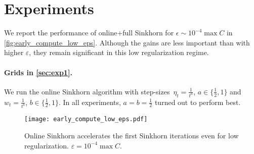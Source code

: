 \section{Experiments}\label{sec:supp_exp}

We report the performance of online+full Sinkhorn for $\epsilon \sim 10^{-4}
\max C$ in \autoref{fig:early_compute_low_eps}. Although the gains are less
important than with higher $\varepsilon$, they remain significant in this low
regularization regime.

\paragraph{Grids in \autoref{sec:exp1}.} We run the online Sinkhorn algorithm
with step-sizes $\eta_t = \frac{1}{t^a}$, $a \in \{ \frac{1}{2}, 1 \}$
and $w_t = \frac{1}{{t^b}}$, $b \in \{ \frac{1}{2}, 1 \}$. In all
experiments, $a = b = \frac{1}{2}$ turned out to perform best.

\begin{figure}[ht]
    \centering
    \texttt{[image: early\_compute\_low\_eps.pdf]}
    \caption{Online Sinkhorn accelerates the first Sinkhorn iterations even for low regularization. $\varepsilon = 10^{-4} \max C$.}
    \label{fig:early_compute_low_eps}
\end{figure}
